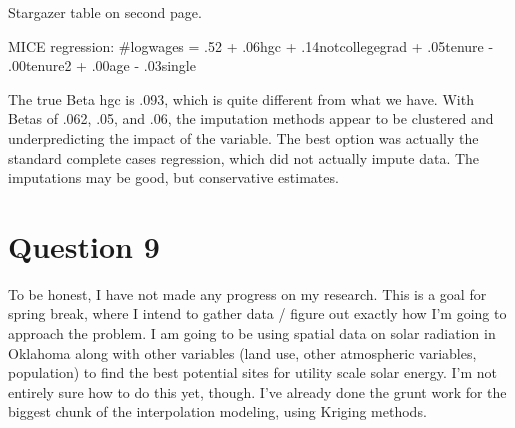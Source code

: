 \documentclass{article}
\begin{document}
Stargazer table on second page. 

MICE regression: 
#logwages = .52 + .06hgc + .14notcollegegrad + .05tenure - .00tenure2 + .00age - .03single 

The true Beta hgc is .093, which is quite different from what we have. With Betas of .062, .05, and .06, the imputation methods appear to be clustered and underpredicting the impact of the variable. The best option was actually the standard complete cases regression, which did not actually impute data. The imputations may be good, but conservative estimates. 



\section{Question 9}
To be honest, I have not made any progress on my research. This is a goal for spring break, where I intend to gather data / figure out exactly how I'm going to approach the problem. I am going to be using spatial data on solar radiation in Oklahoma along with other variables (land use, other atmospheric variables, population) to find the best potential sites for utility scale solar energy. I'm not entirely sure how to do this yet, though. I've already done the grunt work for the biggest chunk of the interpolation modeling, using Kriging methods. 
\end{document}
